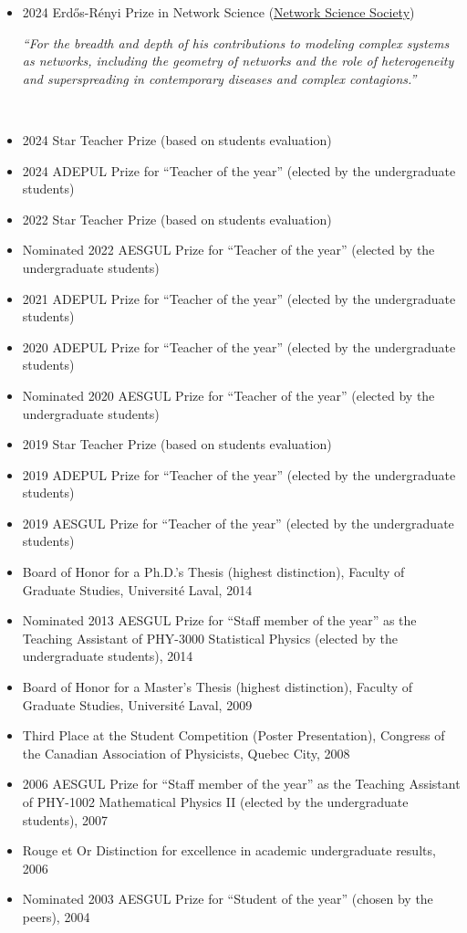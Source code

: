 \documentclass[11pt]{article}
\begin{document}
\begin{itemize}
  \item 2024 Erd\H{o}s-Rényi Prize in Network Science (\href{https://netscisociety.net/award-prizes/er-prize}{Network Science Society})
  \begin{center}
    \begin{minipage}{0.90\textwidth}
      \small\textit{``For the breadth and depth of his contributions to modeling complex systems as networks, including the geometry of networks and the role of heterogeneity and superspreading in contemporary diseases and complex contagions.''}
    \end{minipage}\\
  \end{center}
  \item 2024 Star Teacher Prize (based on students evaluation)
  \item 2024 ADEPUL Prize for ``Teacher of the year'' (elected by the undergraduate students)
  \item 2022 Star Teacher Prize (based on students evaluation)
  \item Nominated 2022 AESGUL Prize for ``Teacher of the year'' (elected by the undergraduate students)
  \item 2021 ADEPUL Prize for ``Teacher of the year'' (elected by the undergraduate students)
  \item 2020 ADEPUL Prize for ``Teacher of the year'' (elected by the undergraduate students)
  \item Nominated 2020 AESGUL Prize for ``Teacher of the year'' (elected by the undergraduate students)
  \item 2019 Star Teacher Prize (based on students evaluation)
  \item 2019 ADEPUL Prize for ``Teacher of the year'' (elected by the undergraduate students)
  \item 2019 AESGUL Prize for ``Teacher of the year'' (elected by the undergraduate students)
  \item Board of Honor for a Ph.D.'s Thesis (highest distinction), Faculty of Graduate Studies, Universit\'e Laval, 2014
  \item Nominated 2013 AESGUL Prize for ``Staff member of the year'' as the Teaching Assistant of PHY-3000 Statistical Physics (elected by the undergraduate students), 2014
  \item Board of Honor for a Master's Thesis (highest distinction), Faculty of Graduate Studies, Universit\'e Laval, 2009
  \item Third Place at the Student Competition (Poster Presentation), Congress of the Canadian Association of Physicists, Quebec City, 2008
  \item 2006 AESGUL Prize for ``Staff member of the year'' as the Teaching Assistant of PHY-1002 Mathematical Physics II (elected by the undergraduate students), 2007
  \item Rouge et Or Distinction for excellence in academic undergraduate results, 2006
  \item Nominated 2003 AESGUL Prize for ``Student of the year'' (chosen by the peers), 2004
\end{itemize} \vspace{0.75\baselineskip}
\end{document}
